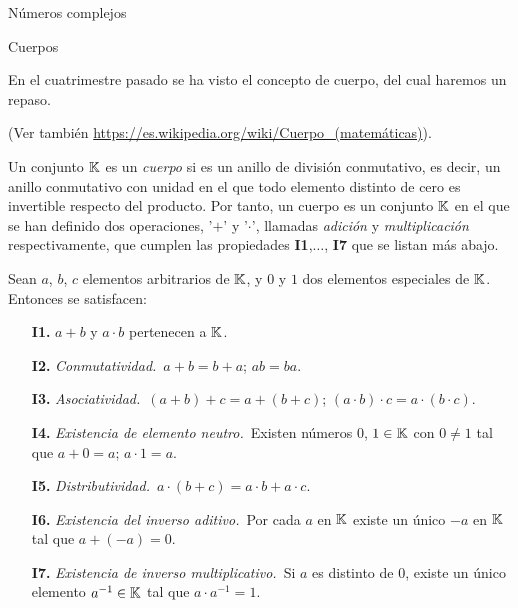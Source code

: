 \begin{chapter}{N\'umeros complejos}\label{chap-num-compl}

    \begin{section}{Cuerpos}\label{seccion-cuerpos}

    En el cuatrimestre pasado se ha visto el concepto de cuerpo, del cual haremos un repaso.

    (Ver también \href{https://es.wikipedia.org/wiki/Cuerpo\_(matemáticas)}{https://es.wikipedia.org/wiki/Cuerpo\_(matemáticas)}).


    \begin{definicion}
        Un conjunto $\mathbb K$ es un \textit{cuerpo} si es un anillo de división conmutativo, es decir, un anillo conmutativo con unidad en el que todo elemento distinto de cero es invertible respecto del producto. Por tanto, un cuerpo es un conjunto $\mathbb K$ en el que se han definido dos operaciones, '$+$' y '$\cdot$', llamadas \textit{adición} y \textit{multiplicación} respectivamente, que cumplen las propiedades \textbf{I1},$\ldots$, \textbf{I7} que se listan más abajo.

        Sean $a$, $b$, $c$ elementos arbitrarios de $\mathbb K$, y $0$ y $1$ dos elementos especiales de $\mathbb K$. Entonces se satisfacen:
        \begin{enumerate}
            \item[\textbf{I1.}] $a+b$ y $a\cdot b$ pertenecen a ${\mathbb K}$.
            \item[\textbf{I2.}] {\em Conmutatividad.}\, $a+b = b+a$; $ab=ba$.
            \item[\textbf{I3.}] {\em Asociatividad.}\, $(a+b)+c = a+(b+c)$;\; $(a\cdot b)\cdot c = a\cdot (b\cdot c)$.
            \item[\textbf{I4.}] {\em Existencia de elemento neutro.}\, Existen números $0$, $1 \in \mathbb K$ con $0\not=1$ tal que $a+0=a$; $a\cdot 1=a$.
            \item[\textbf{I5.}] {\em Distributividad.}\, $a\cdot (b+c)=a\cdot b+a\cdot c$.
            \item[\textbf{I6.}] {\em Existencia del inverso aditivo.}\, Por cada $a$ en ${\mathbb K}$ existe un único  $-a$ en ${\mathbb K}$ tal que $a+(-a)=0$.
            \item[\textbf{I7.}] {\em Existencia de inverso multiplicativo.}\, Si $a$ es distinto de $0$, existe un único elemento $a^{-1} \in \mathbb K$  tal que $a\cdot a^{-1}=1$.
        \end{enumerate}
    \end{definicion}


\end{section}
\end{chapter}

